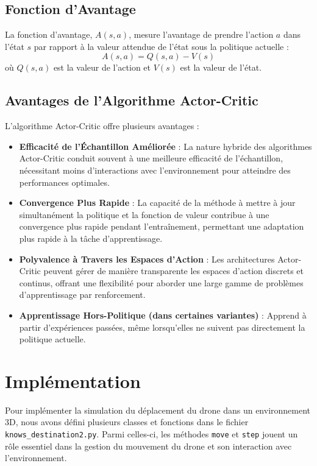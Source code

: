 \documentclass[a4paper, 12pt]{article}
\begin{document}
\subsection{Fonction d'Avantage}
La fonction d'avantage, $A(s, a)$, mesure l'avantage de prendre l'action $a$ dans l'état $s$ par rapport à la valeur attendue de l'état sous la politique actuelle :
\[
A(s, a) = Q(s, a) - V(s)
\]
où $Q(s, a)$ est la valeur de l'action et $V(s)$ est la valeur de l'état.

\subsection{Avantages de l'Algorithme Actor-Critic}
L'algorithme Actor-Critic offre plusieurs avantages :
\begin{itemize}
    \item \textbf{Efficacité de l'Échantillon Améliorée} : La nature hybride des algorithmes Actor-Critic conduit souvent à une meilleure efficacité de l'échantillon, nécessitant moins d'interactions avec l'environnement pour atteindre des performances optimales.
    \item \textbf{Convergence Plus Rapide} : La capacité de la méthode à mettre à jour simultanément la politique et la fonction de valeur contribue à une convergence plus rapide pendant l'entraînement, permettant une adaptation plus rapide à la tâche d'apprentissage.
    \item \textbf{Polyvalence à Travers les Espaces d'Action} : Les architectures Actor-Critic peuvent gérer de manière transparente les espaces d'action discrets et continus, offrant une flexibilité pour aborder une large gamme de problèmes d'apprentissage par renforcement.
    \item \textbf{Apprentissage Hors-Politique (dans certaines variantes)} : Apprend à partir d'expériences passées, même lorsqu'elles ne suivent pas directement la politique actuelle.
\end{itemize}

\section{Implémentation}

Pour implémenter la simulation du déplacement du drone dans un environnement 3D, nous avons défini plusieurs classes et fonctions dans le fichier \texttt{knows\_destination2.py}. Parmi celles-ci, les méthodes \texttt{move} et \texttt{step} jouent un rôle essentiel dans la gestion du mouvement du drone et son interaction avec l’environnement.
\end{document}
